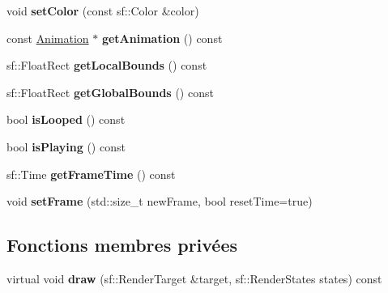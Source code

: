\begin{DoxyCompactItemize}
void {\bfseries set\+Color} (const sf\+::\+Color \&color)
\item 
\mbox{\label{class_animated_sprite_a03bacdbaf638cb6f7987e342980206c2}} 
const \hyperlink{class_animation}{Animation} $\ast$ {\bfseries get\+Animation} () const
\item 
\mbox{\label{class_animated_sprite_ac4c88435c8698f452629c5cd78bfb3c9}} 
sf\+::\+Float\+Rect {\bfseries get\+Local\+Bounds} () const
\item 
\mbox{\label{class_animated_sprite_a86dca0906c53b3e630aaeac2f0085a0e}} 
sf\+::\+Float\+Rect {\bfseries get\+Global\+Bounds} () const
\item 
\mbox{\label{class_animated_sprite_aaf2c2fb0e1487e689af4a6bbeb7e3e85}} 
bool {\bfseries is\+Looped} () const
\item 
\mbox{\label{class_animated_sprite_a55f450add05d45e5369a6ad24f9e438f}} 
bool {\bfseries is\+Playing} () const
\item 
\mbox{\label{class_animated_sprite_a5291f8e24fe2c6e4284bc7ff9499ef77}} 
sf\+::\+Time {\bfseries get\+Frame\+Time} () const
\item 
\mbox{\label{class_animated_sprite_a0b3e38fffdc1d29f46fa08df9ef2a747}} 
void {\bfseries set\+Frame} (std\+::size\+\_\+t new\+Frame, bool reset\+Time=true)
\end{DoxyCompactItemize}
\subsection*{Fonctions membres privées}
\begin{DoxyCompactItemize}
\item 
\mbox{\label{class_animated_sprite_a7564b36acb807662e09a87e5eb45e59a}} 
virtual void {\bfseries draw} (sf\+::\+Render\+Target \&target, sf\+::\+Render\+States states) const
\end{DoxyCompactItemize}
